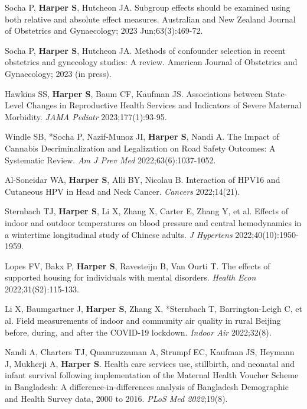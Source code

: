 \documentclass[
  letterpaper,
  DIV=11,
  numbers=noendperiod]{scrartcl}
\begin{document}
\begin{etaremune}
\item *Socha P, \textbf{Harper S}, Hutcheon JA. Subgroup effects should be examined using both relative and absolute effect measures. Australian and New Zealand Journal of Obstetrics and Gynaecology; 2023 Jun;63(3):469-72. 

\item *Socha P, \textbf{Harper S}, Hutcheon JA. Methods of confounder selection in recent obstetrics and gynecology studies: A review. American Journal of Obstetrics and Gynaecology; 2023 (in press).

\item Hawkins SS, \textbf{Harper S}, Baum CF, Kaufman JS. Associations between State-Level Changes in Reproductive Health Services and Indicators of Severe Maternal Morbidity. \emph{JAMA Pediatr} 2023;177(1):93-95.

\item Windle SB, *Socha P, Nazif-Munoz JI, \textbf{Harper S}, Nandi A. The Impact of Cannabis Decriminalization and Legalization on Road Safety Outcomes: A Systematic Review. \emph{Am J Prev Med} 2022;63(6):1037-1052.

\item *Al-Soneidar WA, \textbf{Harper S}, Alli BY, Nicolau B. Interaction of HPV16 and Cutaneous HPV in Head and Neck Cancer. \emph{Cancers} 2022;14(21).

\item *Sternbach TJ, \textbf{Harper S}, Li X, Zhang X, Carter E, Zhang Y, et al. Effects of indoor and outdoor temperatures on blood pressure and central hemodynamics in a wintertime longitudinal study of Chinese adults. \emph{J Hypertens} 2022;40(10):1950-1959.

\item *Lopes FV, Bakx P, \textbf{Harper S}, Ravesteijn B, Van Ourti T. The effects of supported housing for individuals with mental disorders. \emph{Health Econ} 2022;31(S2):115-133.

\item Li X, Baumgartner J, \textbf{Harper S}, Zhang X, *Sternbach T, Barrington-Leigh C, et al. Field measurements of indoor and community air quality in rural Beijing before, during, and after the COVID-19 lockdown. \emph{Indoor Air} 2022;32(8).

\item Nandi A, Charters TJ, Quamruzzaman A, Strumpf EC, Kaufman JS, Heymann J, Mukherji A, \textbf{Harper S}. Health care services use, stillbirth, and neonatal and infant survival following implementation of the Maternal Health Voucher Scheme in Bangladesh: A difference-in-differences analysis of Bangladesh Demographic and Health Survey data, 2000 to 2016. \emph{PLoS Med 2022};19(8).


\end{etaremune}
\end{document}
